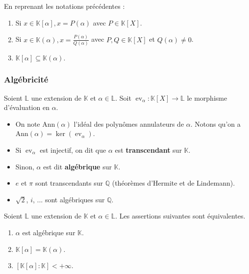 	\begin{proposition}
		En reprenant les notations précédentes :
		\begin{enumerate}[label=(\roman*)]
			\item Si $x \in \mathbb{K}[\alpha], x = P(\alpha)$ avec $P \in \mathbb{K}[X]$.
			\item Si $x \in \mathbb{K}(\alpha), x = \frac{P(\alpha)}{Q(\alpha)}$ avec $P, Q \in \mathbb{K}[X]$ et $Q(\alpha) \neq 0$.
			\item $\mathbb{K}[\alpha] \subseteq \mathbb{K}(\alpha)$.
		\end{enumerate}
	\end{proposition}

	\subsubsection{Algébricité}

	\begin{definition}
		Soient $\mathbb{L}$ une extension de $\mathbb{K}$ et $\alpha \in \mathbb{L}$. Soit $\operatorname{ev}_\alpha : \mathbb{K}[X] \rightarrow \mathbb{L}$ le morphisme d'évaluation en $\alpha$.
		\begin{itemize}
			\item On note $\mathrm{Ann}(\alpha)$ l'idéal des polynômes annulateurs de $\alpha$. Notons qu'on a $\mathrm{Ann}(\alpha) = \ker(\operatorname{ev}_\alpha)$.
			\item Si $\operatorname{ev}_\alpha$ est injectif, on dit que $\alpha$ est \textbf{transcendant} sur $\mathbb{K}$.
			\item Sinon, $\alpha$ est dit \textbf{algébrique} sur $\mathbb{K}$.
		\end{itemize}
	\end{definition}

	\begin{example}
		\begin{itemize}
			\item $e$ et $\pi$ sont transcendants sur $\mathbb{Q}$ (théorèmes d'Hermite et de Lindemann).
			\item $\sqrt{2}$, $i$, ... sont algébriques sur $\mathbb{Q}$.
		\end{itemize}
	\end{example}

	\begin{proposition}
		Soient $\mathbb{L}$ une extension de $\mathbb{K}$ et $\alpha \in \mathbb{L}$. Les assertions suivantes sont équivalentes.
		\begin{enumerate}[label=(\roman*)]
			\item $\alpha$ est algébrique sur $\mathbb{K}$.
			\item $\mathbb{K}[\alpha] = \mathbb{K}(\alpha)$.
			\item $[\mathbb{K}[\alpha]:\mathbb{K}] < +\infty$.
		\end{enumerate}
	\end{proposition}

